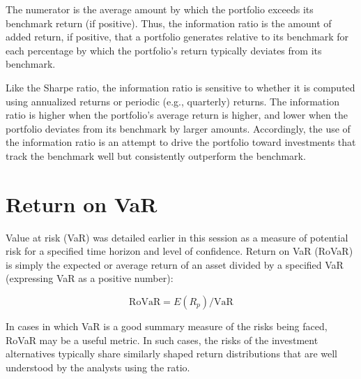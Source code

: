 \documentclass[11pt]{article}
\begin{document}
The numerator is the average amount by which the portfolio exceeds its benchmark return (if positive). Thus, the information ratio is the amount of added return, if positive, that a portfolio generates relative to its benchmark for each percentage by which the portfolio's return typically deviates from its benchmark.

Like the Sharpe ratio, the information ratio is sensitive to whether it is computed using annualized returns or periodic (e.g., quarterly) returns. The information ratio is higher when the portfolio's average return is higher, and lower when the portfolio deviates from its benchmark by larger amounts. Accordingly, the use of the information ratio is an attempt to drive the portfolio toward investments that track the benchmark well but consistently outperform the benchmark.

\section*{Return on VaR}
Value at risk (VaR) was detailed earlier in this session as a measure of potential risk for a specified time horizon and level of confidence. Return on VaR (RoVaR) is simply the expected or average return of an asset divided by a specified VaR (expressing VaR as a positive number):

$$
\mathrm{RoVaR}=E\left(R_{p}\right) / \mathrm{VaR}
$$

In cases in which VaR is a good summary measure of the risks being faced, RoVaR may be a useful metric. In such cases, the risks of the investment alternatives typically share similarly shaped return distributions that are well understood by the analysts using the ratio.
\end{document}
